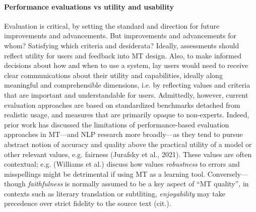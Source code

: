 \paragraph{Performance evaluations vs utility and usability}
Evaluation is critical, by setting the standard and direction for future improvements and advancements. But improvements and advancements for whom? Satisfying which criteria and desiderata? Ideally, assessments should reflect utility for users and feedback into MT design. 
%
%
Also, to make informed decisions about how and when to use a system, lay users would need to receive clear communications about their utility and capabilities, ideally along meaningful and comprehensible dimensions, i.e. by reflecting values and criteria that are important and understandable for users. 
%
%
Admittedly, however, current evaluation approaches are based on standardized benchmarks detached from realistic usage, and measures that are primarily opaque to non-experts. 
%
%
%
Indeed, prior work has discussed the limitations of performance-based
evaluation approaches in MT---and NLP research more broadly---as they tend
to pursue  abstract notion of accuracy and quality above the practical utility of a model or other relevant values, e.g. fairness (Jurafsky et al., 2021).
%
These values are often contextual; e.g.  (Williams et al.) discuss how values \textit{robustness} to errors and misspellings might be detrimental if using MT as a learning tool. Conversely--- though \textit{faithfulness} is normally assumed to be a key aspect of ``MT quality'', in contexts such as literary translation or subtliting, \textit{enjoyability} may take precedence over strict fidelity to the source text (cit.).

